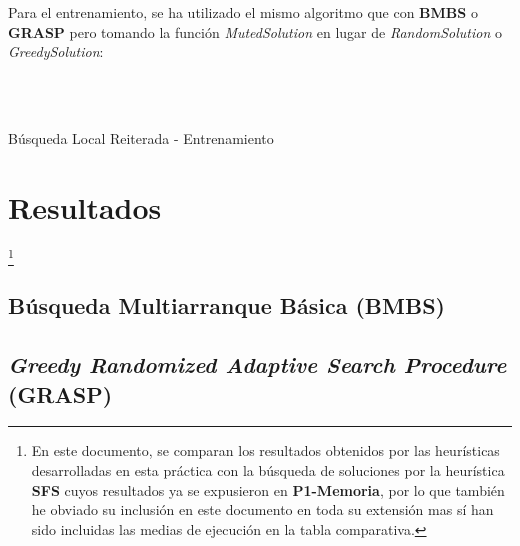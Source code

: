\documentclass[a4paper, 11pt]{article}
\begin{document}
			Para el entrenamiento, se ha utilizado el mismo algoritmo que con \textbf{BMBS} o
			\textbf{GRASP} pero tomando la función \textit{MutedSolution} en lugar de
			\textit{RandomSolution} o \textit{GreedySolution}:
			
			\begin{algorithm}[H]
				\begin{algorithmic}[1]
				\REQUIRE \ \\
						 \
					\ENDIF
				\ENDFOR
			\end{algorithmic}
		\caption{Búsqueda Local Reiterada - Entrenamiento}
		\label{ILS}
		\end{algorithm}
		
	\section{Resultados}\footnote{En este documento, se comparan los resultados obtenidos por las
	heurísticas desarrolladas en esta práctica con la búsqueda de soluciones por la heurística
	\textbf{SFS} cuyos resultados ya se expusieron en \textbf{P1-Memoria}, por lo que también he
	obviado su inclusión en este documento en toda su extensión mas sí han sido incluidas las medias
	de ejecución en la tabla comparativa.}
		\subsection{Búsqueda Multiarranque Básica (\textbf{BMBS})}
			
			
			
		\subsection{\textit{Greedy Randomized Adaptive Search Procedure} (\textbf{GRASP})}
			
			
			
\end{document}
